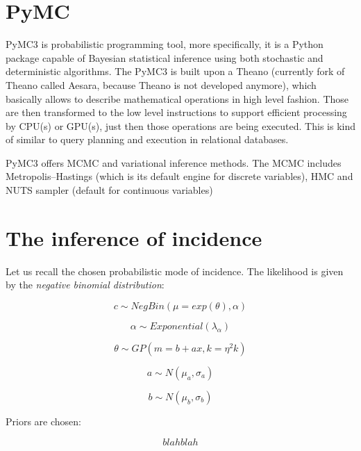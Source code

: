 \documentclass[
  digital, %
  oneside, %
  lof,     %
  lot,     %
]{fithesis4}
\begin{document}
\section{PyMC}

PyMC3 is probabilistic programming tool, more specifically, 
it is a Python package capable of Bayesian statistical 
inference using both stochastic and deterministic algorithms. 
The PyMC3 is built upon a Theano (currently fork of 
Theano called Aesara, because Theano is not developed anymore), 
which basically allows to describe mathematical operations in 
high level fashion. 
Those are then transformed to the low level instructions to 
support efficient processing by CPU(s) or GPU(s), just then 
those operations are being executed. 
This is kind of similar to query planning and execution in 
relational databases.

PyMC3 offers MCMC and variational inference methods.
The MCMC includes Metropolis–Hastings (which is its default 
engine for discrete variables), HMC and NUTS sampler (default 
for continuous variables)


\section{The inference of incidence}

Let us recall the chosen probabilistic mode of incidence.
The likelihood is given by the \textit{negative binomial distribution}:

\begin{equation}
  c \sim NegBin(\mu=exp(\theta), \alpha)
\end{equation}

\begin{equation}
  \alpha \sim Exponential(\lambda_\alpha)
\end{equation}

\begin{equation}
  \theta \sim GP(m=b + ax, k=\eta^2 k)
\end{equation}

\begin{equation}
  a \sim N(\mu_a, \sigma_a)
\end{equation}

\begin{equation}
  b \sim N(\mu_b, \sigma_b)
\end{equation}

Priors are chosen:

\begin{equation}
  blah blah
\end{equation}
\end{document}
